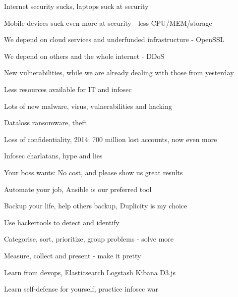 \documentclass[20pt,landscape,a4paper,footrule]{foils}
\begin{document}

\begin{list1}
\item Internet security sucks, laptops suck at security
\item Mobile devices suck even more at security - less CPU/MEM/storage
\item We depend on cloud services and underfunded infrastructure - OpenSSL
\item We depend on others and the whole internet - DDoS
\item New vulnerabilities, while we are already dealing with those from yesterday
\end{list1}



\begin{list1}
\item Less resources available for IT and infosec
\item Lots of new malware, virus, vulnerabilities and hacking
\item Dataloss ransomware, theft
\item Loss of confidentiality, 2014: 700 million lost accounts, now even more
\item Infosec charlatans, hype and lies
\end{list1}

\vskip 2cm
\centerline{Your boss wants: No cost, and please show us great results}


\vskip 2cm



\begin{list1}
\item Automate your job, Ansible is our preferred tool
\item Backup your life, help others backup, Duplicity is my choice
\item Use hackertools to detect and identify
\item Categorise, sort, prioritize, group problems - solve more
\item Measure, collect and present - make it pretty
\item Learn from devops, Elasticsearch Logstash Kibana D3.js
\item {} Learn self-defense for yourself, practice infosec war
\end{list1}
\end{document}
